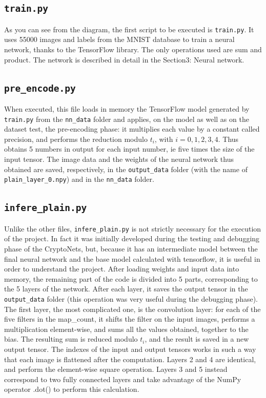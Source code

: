 \subsection{\texttt{train.py}}

As you can see from the diagram, the first script to be executed is \texttt{train.py}. It uses 55000 images and labels from the MNIST database to train a neural network, thanks to the TensorFlow library. The only operations used are sum and product. The network is described in detail in the Section3: Neural network.

\subsection{\texttt{pre_encode.py}}

When executed, this file loads in memory the TensorFlow model generated by \texttt{train.py} from the \texttt{nn_data} folder and applies, on the model as well as on the dataset test, the pre-encoding phase: it multiplies each value by a constant called precision, and performs the reduction modulo $t_i$, with $i = 0,1,2,3,4$. Thus obtains 5 numbers in output for each input number, ie five times the size of the input tensor. The image data and the weights of the neural network thus obtained are saved, respectively, in the \texttt{output_data} folder (with the name of \texttt{plain_layer_0.npy}) and in the \texttt{nn_data} folder.

\subsection{\texttt{infere_plain.py}}

Unlike the other files, \texttt{infere_plain.py} is not strictly necessary for the execution of the project. In fact it was initially developed during the testing and debugging phase of the CryptoNets, but, because it has an intermediate model between the final neural network and the base model calculated with tensorflow, it is useful in order to understand the project. After loading weights and input data into memory, the remaining part of the code is divided into 5 parts, corresponding to the 5 layers of the network. After each layer, it saves the output tensor in the \texttt{output_data} folder (this operation was very useful during the debugging phase). The first layer, the most complicated one, is the convolution layer: for each of the five filters in the map_count, it shifts the filter on the input images, performs a multiplication element-wise, and sums all the values obtained, together to the bias. The resulting sum is reduced modulo $t_i$, and the result is saved in a new output tensor. The indexes of the input and output tensors works in such a way that each image is flattened after the computation. Layers 2 and 4 are identical, and perform the element-wise square operation. Layers 3 and 5 instead correspond to two fully connected layers and take advantage of the NumPy operator .dot() to perform this calculation.

